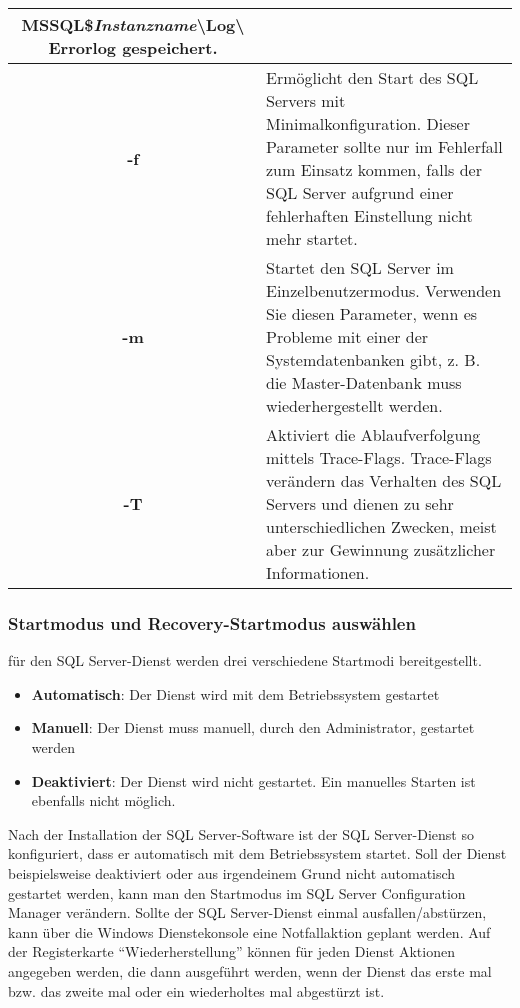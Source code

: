 \begin{center}
\begin{small}
\begin{supertabular}{|c|p{10cm}|}
{                MSSQL\$\textit{Instanzname}\textbackslash Log\textbackslash
                Errorlog} gespeichert.\\
                \hline
                \textbf{-f} & Ermöglicht den Start des SQL Servers mit
                Minimalkonfiguration. Dieser Parameter sollte nur im
                Fehlerfall zum Einsatz kommen, falls der SQL Server aufgrund
                einer fehlerhaften Einstellung nicht mehr startet.\\
                \hline
                \textbf{-m} & Startet den SQL Server im Einzelbenutzermodus.
                Verwenden Sie diesen Parameter, wenn es Probleme mit einer der
                Systemdatenbanken gibt, z. B. die Master-Datenbank muss
                wiederhergestellt werden.\\
                \hline
                \textbf{-T} & Aktiviert die Ablaufverfolgung mittels
                Trace-Flags. Trace-Flags verändern das Verhalten des SQL
                Servers und dienen zu sehr unterschiedlichen Zwecken, meist
                aber zur Gewinnung zusätzlicher Informationen.\\
              \end{supertabular}
            \end{small}
          \end{center}
        \subsubsection{Startmodus und Recovery-Startmodus auswählen}
          f\"ur den SQL Server-Dienst werden drei verschiedene Startmodi
          bereitgestellt.
          \begin{itemize}
              \item \textbf{Automatisch}: Der Dienst wird mit dem Betriebssystem
              gestartet
              \item \textbf{Manuell}: Der Dienst muss manuell, durch den
              Administrator, gestartet werden
              \item \textbf{Deaktiviert}: Der Dienst wird nicht gestartet. Ein
              manuelles Starten ist ebenfalls nicht möglich.
          \end{itemize}
          Nach der Installation der SQL Server-Software ist der
          SQL Server-Dienst so konfiguriert, dass er automatisch mit dem
          Betriebssystem startet. Soll der Dienst beispielsweise deaktiviert
          oder aus irgendeinem Grund nicht automatisch gestartet werden, kann
          man den Startmodus im SQL Server Configuration Manager verändern.
\clearpage
          Sollte der SQL Server-Dienst einmal ausfallen/abstürzen, kann über die
          Windows Dienstekonsole eine Notfallaktion geplant werden. Auf der
          Registerkarte \enquote{Wiederherstellung} können f\"ur jeden Dienst
          Aktionen angegeben werden, die dann ausgeführt werden, wenn der Dienst
          das erste mal bzw. das zweite mal oder ein wiederholtes mal abgestürzt
          ist.
          
